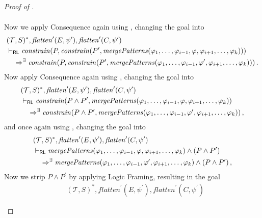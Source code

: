 \begin{proof}[Proof of ]
\begin{enumerate}
\begin{align*}
    \end{align*}
    Now we apply Consequence again using ,
    changing the goal into
    \begin{align*}
        & (\mathcal{T}, S)^*, \mathit{flatten}^\prime(E, \psi^\prime), \mathit{flatten}^\prime(C, \psi^\prime)
        \\& \vdash_{\mathsf{RL}}
        \mathit{constrain}(P, \mathit{constrain}(P^\prime, \mathit{mergePatterns}(\varphi_1, \ldots, \varphi_{i-1}, \varphi, \varphi_{i+1}, \ldots, \varphi_k)))
        \\&\quad \Rightarrow^\exists
        \mathit{constrain}(P, \mathit{constrain}(P^\prime, \mathit{mergePatterns}(\varphi_1, \ldots, \varphi_{i-1}, \varphi^\prime, \varphi_{i+1}, \ldots, \varphi_k))) \, .
    \end{align*}
    Now apply Consequence again using ,
    changing the goal into
    \begin{align*}
        & (\mathcal{T}, S)^*, \mathit{flatten}^\prime(E, \psi^\prime), \mathit{flatten}^\prime(C, \psi^\prime)
        \\& \vdash_{\mathsf{RL}}
        \mathit{constrain}(P \land P^\prime, \mathit{mergePatterns}(\varphi_1, \ldots, \varphi_{i-1}, \varphi, \varphi_{i+1}, \ldots, \varphi_k))
        \\&\quad \Rightarrow^\exists
        \mathit{constrain}(P \land P^\prime, \mathit{mergePatterns}(\varphi_1, \ldots, \varphi_{i-1}, \varphi^\prime, \varphi_{i+1}, \ldots, \varphi_k)) \, ,
    \end{align*}
    and once again using , changing the goal into
    \begin{align*}
        & (\mathcal{T}, S)^*, \mathit{flatten}^\prime(E, \psi^\prime), \mathit{flatten}^\prime(C, \psi^\prime)
        \\& \vdash_{\mathsf{RL}}
        \mathit{mergePatterns}(\varphi_1, \ldots, \varphi_{i-1}, \varphi, \varphi_{i+1}, \ldots, \varphi_k)
        \land (P \land P^\prime)
        \\&\quad \Rightarrow^\exists
        \mathit{mergePatterns}(\varphi_1, \ldots, \varphi_{i-1}, \varphi^\prime, \varphi_{i+1}, \ldots, \varphi_k) \land (P \land P^\prime) \, ,
    \end{align*}
    Now we strip $P \land P^\prime$ by applying Logic Framing, resulting in the goal
    \begin{align*}
        & (\mathcal{T}, S)^*, \mathit{flatten}^\prime(E, \psi^\prime), \mathit{flatten}^\prime(C, \psi^\prime)

\end{align*}
\end{enumerate}
\end{proof}
